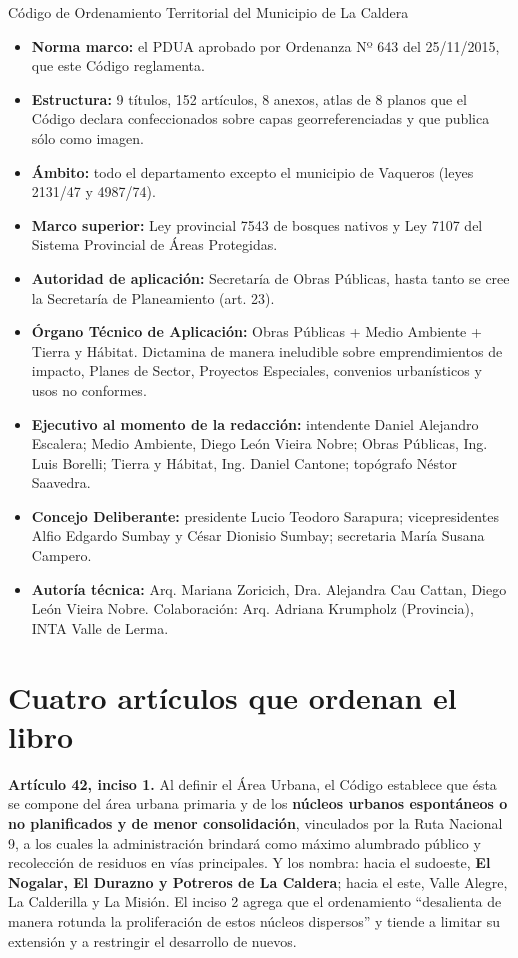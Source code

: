 \begin{ficha}{Código de Ordenamiento Territorial del Municipio de La Caldera}
\begin{itemize}[leftmargin=*,nosep]
\item \textbf{Norma marco:} el PDUA aprobado por Ordenanza Nº 643 del 25/11/2015, que este Código reglamenta.
\item \textbf{Estructura:} 9 títulos, 152 artículos, 8 anexos, atlas de 8 planos que el Código declara confeccionados sobre capas georreferenciadas y que publica sólo como imagen.
\item \textbf{Ámbito:} todo el departamento excepto el municipio de Vaqueros (leyes 2131/47 y 4987/74).
\item \textbf{Marco superior:} Ley provincial 7543 de bosques nativos y Ley 7107 del Sistema Provincial de Áreas Protegidas.
\item \textbf{Autoridad de aplicación:} Secretaría de Obras Públicas, hasta tanto se cree la Secretaría de Planeamiento (art. 23).
\item \textbf{Órgano Técnico de Aplicación:} Obras Públicas + Medio Ambiente + Tierra y Hábitat. Dictamina de manera ineludible sobre emprendimientos de impacto, Planes de Sector, Proyectos Especiales, convenios urbanísticos y usos no conformes.
\item \textbf{Ejecutivo al momento de la redacción:} intendente Daniel Alejandro Escalera; Medio Ambiente, Diego León Vieira Nobre; Obras Públicas, Ing. Luis Borelli; Tierra y Hábitat, Ing. Daniel Cantone; topógrafo Néstor Saavedra.
\item \textbf{Concejo Deliberante:} presidente Lucio Teodoro Sarapura; vicepresidentes Alfio Edgardo Sumbay y César Dionisio Sumbay; secretaria María Susana Campero.
\item \textbf{Autoría técnica:} Arq. Mariana Zoricich, Dra. Alejandra Cau Cattan, Diego León Vieira Nobre. Colaboración: Arq. Adriana Krumpholz (Provincia), INTA Valle de Lerma.
\end{itemize}
\end{ficha}

\section{Cuatro artículos que ordenan el libro}

\textbf{Artículo 42, inciso 1.} Al definir el Área Urbana, el Código establece que ésta se compone del área urbana primaria y de los \textbf{núcleos urbanos espontáneos o no planificados y de menor consolidación}, vinculados por la Ruta Nacional 9, a los cuales la administración brindará como máximo alumbrado público y recolección de residuos en vías principales. Y los nombra: hacia el sudoeste, \textbf{El Nogalar, El Durazno y Potreros de La Caldera}; hacia el este, Valle Alegre, La Calderilla y La Misión. El inciso 2 agrega que el ordenamiento ``desalienta de manera rotunda la proliferación de estos núcleos dispersos'' y tiende a limitar su extensión y a restringir el desarrollo de nuevos.

